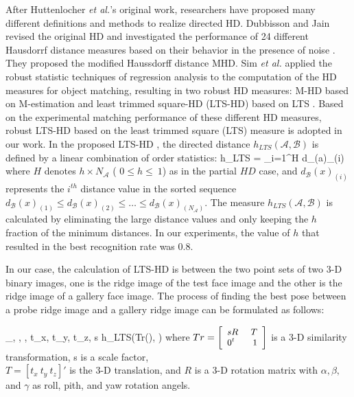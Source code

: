 After Huttenlocher \textit{et al.}'s original work, researchers have
proposed many different definitions and methods to realize directed
HD. Dubbisson and Jain revised the original HD and investigated the
performance of 24 different Hausdorrf distance measures based on
their behavior in the presence of noise \cite{dubisson94}. They
proposed the modified Haussdorff distance MHD. Sim \textit{et al.}
applied the robust statistic techniques of regression analysis to
the computation of the HD measures for object matching, resulting in
two robust HD measures: M-HD based on M-estimation and least trimmed
square-HD (LTS-HD) based on LTS \cite{sim99}. Based on the
experimental matching performance of these different HD measures,
robust LTS-HD based on the least trimmed square (LTS) measure
\cite{sim99} is adopted in our work. In the proposed LTS-HD
\cite{sim99}, the directed distance
$h_{LTS}(\mathcal{A},\mathcal{B})$ is defined by a linear
combination of order statistics: \beq \label{eq_lts_HD}h_{LTS} =
\sum_{i=1}^H d_(a)_{(i)} \eeq where $H$
denotes $h \times N_\mathcal{A}$ ( $0 \leq h \leq\ 1$) as in the
partial $HD$ case, and $d_\mathcal{B}(x)_{(i)}$ represents the
$i^{th}$ distance value in the sorted sequence
$d_\mathcal{B}(x)_{(1)} \leq d_\mathcal{B}(x)_{(2)} \leq \dots \leq
d_\mathcal{B}(x)_{(N_\mathcal{A})}$. The measure
$h_{LTS}(\mathcal{A},\mathcal{B})$ is calculated by eliminating the
large distance values and only keeping the $h$ fraction of the
minimum distances. In our experiments, the value of $h$ that
resulted in the best recognition rate was $0.8$.

In our case, the calculation of LTS-HD is between the two point sets
of two 3-D binary images, one is the ridge image of the test face
image and the other is the ridge image of a gallery face image. The
process of finding the best pose between a probe ridge image and a
gallery ridge image can be formulated as follows:

\beq \label{eq_optimization_2} \arg \min_{\alpha, \beta, \gamma,
t_x, t_y, t_z, s} h_{LTS}(Tr(), ) \eeq where
$\textstyle\small{Tr = \left[\begin{array}{lr}sR &~ T\\
0^t &~ 1 \end{array}\right]}$ is a 3-D similarity transformation, s
is a scale factor, \\
$\textstyle{T = [t_x~t_y~t_z]'}$ is the 3-D translation, and $R$ is
a 3-D rotation matrix with $\alpha, \beta,$ and $\gamma$ as roll,
pith, and yaw rotation angels.

